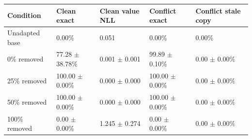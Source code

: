 \begin{tabular}{lllll}
\toprule
Condition & Clean exact & Clean value NLL & Conflict exact & Conflict stale copy \\
\midrule
Unadapted base & 0.00\% & 0.051 & 0.00\% & 0.00\% \\
0\% removed & 77.28 $\pm$ 38.78\% & 0.001 $\pm$ 0.001 & 99.89 $\pm$ 0.10\% & 0.00 $\pm$ 0.00\% \\
25\% removed & 100.00 $\pm$ 0.00\% & 0.000 $\pm$ 0.000 & 100.00 $\pm$ 0.00\% & 0.00 $\pm$ 0.00\% \\
50\% removed & 100.00 $\pm$ 0.00\% & 0.000 $\pm$ 0.000 & 100.00 $\pm$ 0.00\% & 0.00 $\pm$ 0.00\% \\
100\% removed & 0.00 $\pm$ 0.00\% & 1.245 $\pm$ 0.274 & 0.00 $\pm$ 0.00\% & 0.00 $\pm$ 0.00\% \\
\bottomrule
\end{tabular}